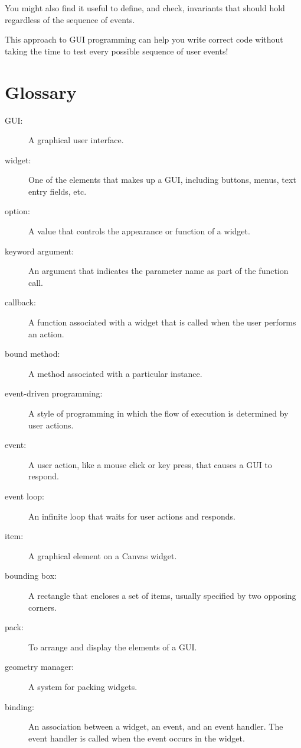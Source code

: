 \documentclass[10pt]{book}
\begin{document}
You might also find it useful to define, and check, invariants that
should hold regardless of the sequence of events.

This approach to GUI programming can help you write correct
code without taking the time to test every possible sequence
of user events!


\section{Glossary}

\begin{description}

\item[GUI:] A graphical user interface.

\item[widget:] One of the elements that makes up a GUI, including
buttons, menus, text entry fields, etc. 

\item[option:] A value that controls the appearance or function of
a widget.

\item[keyword argument:] An argument that indicates the parameter
name as part of the function call.

\item[callback:] A function associated with a widget that is
called when the user performs an action.

\item[bound method:] A method associated with a particular instance.

\item[event-driven programming:] A style of programming in which
the flow of execution is determined by user actions.

\item[event:] A user action, like a mouse click or key press, that
causes a GUI to respond.

\item[event loop:] An infinite loop that waits for user actions
and responds.

\item[item:] A graphical element on a Canvas widget.

\item[bounding box:] A rectangle that encloses a set of items,
usually specified by two opposing corners.

\item[pack:] To arrange and display the elements of a GUI.

\item[geometry manager:] A system for packing widgets.

\item[binding:] An association between a widget, an event, and
an event handler.  The event handler is called when the event
occurs in the widget.

\end{description}
\end{document}
